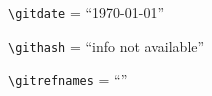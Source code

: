 \documentclass{article}
\providecommand*{\githash}{info not available}
\providecommand*{\gitdate}{\today}
\providecommand*{\gitrefnames}{}
\begin{document}
\verb+\gitdate+ = ``\gitdate''

\verb+\githash+ = ``\githash''

\verb+\gitrefnames+ = ``\gitrefnames''

\thispagestyle{empty}
\end{document}
